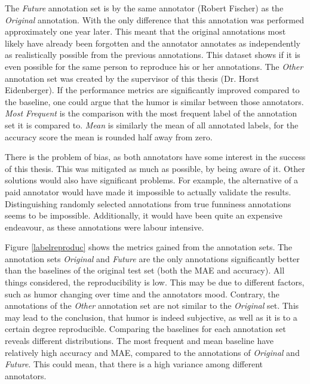 \documentclass[draft,final,oneside]{vutinfth} %
\begin{document}
The \textit{Future} annotation set is by the same annotator (Robert Fischer) as the \textit{Original} annotation. With the only difference that this annotation was performed approximately one year later. This meant that the original annotations most likely have already been forgotten and the annotator annotates as independently as realistically possible from the previous annotations. This dataset shows if it is even possible for the same person to reproduce his or her annotations. The \textit{Other} annotation set was created by the supervisor of this thesis (Dr. Horst Eidenberger). If the performance metrics are significantly improved compared to the baseline, one could argue that the humor is similar between those annotators. \textit{Most Frequent} is the comparison with the most frequent label of the annotation set it is compared to. \textit{Mean} is similarly the mean of all annotated labels, for the accuracy score the mean is rounded half away from zero.

There is the problem of bias, as both annotators have some interest in the success of this thesis. This was mitigated as much as possible, by being aware of it. Other solutions would also have significant problems. For example, the alternative of a paid annotator would have made it impossible to actually validate the results. Distinguishing randomly selected annotations from true funniness annotations seems to be impossible. Additionally, it would have been quite an expensive endeavour, as these annotations were labour intensive.

Figure \ref{labelreproduc} shows the metrics gained from the annotation sets. The annotation sets \textit{Original} and \textit{Future} are the only annotations significantly better than the baselines of the original test set (both the MAE and accuracy). All things considered, the reproducibility is low. This may be due to different factors, such as humor changing over time and the annotators mood. Contrary, the annotations of the \textit{Other} annotation set are not similar to the \textit{Original} set. This may lead to the conclusion, that humor is indeed subjective, as well as it is to a certain degree reproducible. Comparing the baselines for each annotation set reveals different distributions. The most frequent and mean baseline have relatively high accuracy and MAE, compared to the annotations of \textit{Original} and \textit{Future}. This could mean, that there is a high variance among different annotators.
\end{document}

